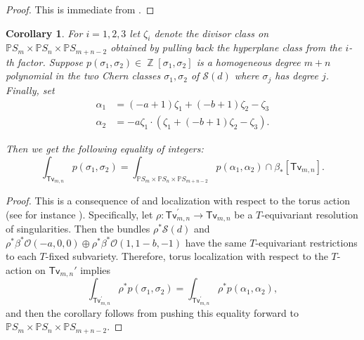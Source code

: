 \documentclass[reqno, 11pt]{amsart}
\theoremstyle{plain}
\newtheorem{corollary}[theorem]{Corollary}
\theoremstyle{remark}
\newtheorem{remark}[theorem]{Remark}
\renewcommand{\P}{\mathbb{P}}
\renewcommand{\O}{\mathscr{O}}
\renewcommand{\S}{\mathscr{S}}
\DeclareMathOperator{\Z}{\mathbb{Z}}
\newcommand{\transvectant}{\mathsf{Tv}}
\begin{document}
\begin{proof}
    This is immediate from .
\end{proof}



\begin{corollary}
    \label{corollary:intersectionnumbers}
    For $i = 1,2,3$ let $\zeta_{i}$ denote the divisor class on $\P S_{m} \times \P S_{n} \times \P S_{m+n-2}$ obtained by pulling back the hyperplane class from the $i$-th factor.  Suppose $p(\sigma_1,\sigma_2) \in \Z[\sigma_1,\sigma_2]$ is a homogeneous degree $m+n$ polynomial in the two Chern classes $\sigma_1,\sigma_2$ of $\mathscr{S}(d)$ where $\sigma_j$ has degree $j$.   Finally, set 
    \begin{align*}
        \alpha_{1} &= (-a+1)\zeta_1 + (-b+1)\zeta_2 - \zeta_3\\
        \alpha_{2} &= -a\zeta_1 \cdot \left(\zeta_1 + (-b+1)\zeta_2 - \zeta_3\right).
    \end{align*}
    
    Then we get the following equality of integers: \[\int_{\transvectant_{m,n}} p(\sigma_1,\sigma_2) = \int_{\P S_{m} \times \P S_{n} \times \P S_{m+n-2}} p(\alpha_1,\alpha_2) \cap \beta_{*}[\transvectant_{m,n}].\]
\end{corollary}

\begin{proof}
    This is a consequence of  and localization with respect to the torus action (see for instance \cite{edidin1998localization}).  Specifically, let $\rho: \transvectant_{m,n}^{'} \to \transvectant_{m,n}$ be a $T$-equivariant resolution of singularities. Then the bundles $\rho^{*}\S(d)$ and $\rho^{*}\beta^{*}\O(-a,0,0) \oplus \rho^{*}\beta^{*}\O(1,1-b,-1)$ have the same $T$-equivariant restrictions to each $T$-fixed subvariety. Therefore, torus localization with respect to the $T$-action on $\transvectant_{m,n}'$ implies $$\int_{\transvectant_{m,n}^{'}} \rho^{*} p(\sigma_1,\sigma_2) = \int_{\transvectant_{m,n}^{'}} \rho^{*} p(\alpha_1,\alpha_2),$$ and then the corollary follows from pushing this equality forward to $\P S_{m} \times \P S_{n} \times \P S_{m+n-2}$.
\end{proof}
\end{document}
